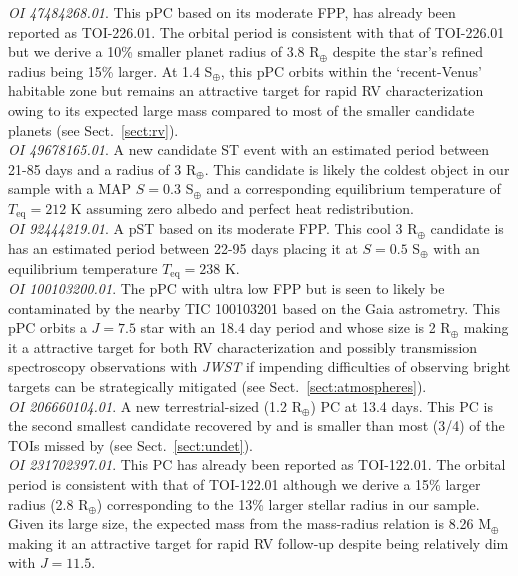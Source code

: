\emph{OI 47484268.01}. This pPC based on its moderate FPP, has already been reported as TOI-226.01.
The \pipeline{} orbital period is consistent with that of TOI-226.01 but we derive a 10\% smaller
planet radius of 3.8 R$_{\oplus}$ despite the star's refined radius being 15\% larger. At 1.4 S$_{\oplus}$,
this pPC orbits within the `recent-Venus' habitable zone but remains an attractive target for rapid RV
characterization owing to its expected large mass compared to most of the smaller candidate planets (see
Sect.~\ref{sect:rv}). \\

\emph{OI 49678165.01}. A new candidate ST event with an estimated period between 21-85 days and a radius of
3 R$_{\oplus}$. This candidate is likely the coldest object in our sample with a MAP $S=0.3$ S$_{\oplus}$
and a corresponding equilibrium temperature of $T_{\text{eq}}= 212$ K assuming zero albedo and perfect heat redistribution. \\

\emph{OI 92444219.01}. A pST based on its moderate FPP. This cool 3 R$_{\oplus}$ candidate is
has an estimated period between 22-95 days placing it at $S=0.5$ S$_{\oplus}$ with
an equilibrium temperature $T_{\text{eq}}= 238$ K. \\

\emph{OI 100103200.01}. The pPC with ultra low FPP but is seen to likely be contaminated by the nearby
TIC 100103201 based on the Gaia astrometry. This pPC orbits a $J=7.5$ star with an 18.4 day period and
whose size is 2 R$_{\oplus}$ making it a attractive target for both RV characterization and possibly
transmission spectroscopy observations with \emph{JWST} if impending difficulties of observing
bright targets can be strategically mitigated (see Sect.~\ref{sect:atmospheres}). \\

\emph{OI 206660104.01}. A new terrestrial-sized (1.2 R$_{\oplus}$) PC at 13.4 days. This PC is the
second smallest candidate recovered by \pipeline{} and is smaller than most (3/4) of the TOIs missed by
\pipeline{} (see Sect.~\ref{sect:undet}). \\

\emph{OI 231702397.01}. This PC has already been reported as TOI-122.01. The \pipeline{} orbital
period is consistent with that of TOI-122.01 although we derive a 15\% larger radius (2.8 R$_{\oplus}$)
corresponding to the 13\% larger stellar radius in our sample. Given its large size, the expected
mass from the \cite{chen17} mass-radius relation is 8.26 M$_{\oplus}$ making it an attractive target
for rapid RV follow-up despite being relatively dim with $J=11.5$. \\

